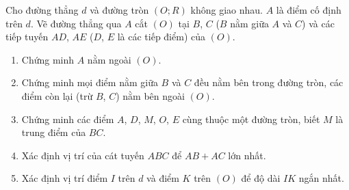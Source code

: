 \begin{bt}%
	Cho đường thẳng $d$ và đường tròn $(O;R)$ không giao nhau. $A$ là điểm cố định trên $d$. Vẽ đường thẳng qua $A$ cắt $(O)$ tại $B$, $C$ ($B$ nằm giữa $A$ và $C$) và các tiếp tuyến $AD$, $AE$ ($D$, $E$ là các tiếp điểm) của $(O)$.
	\begin{enumerate}
		\item Chứng minh $A$ nằm ngoài $(O)$.
		\item Chứng minh mọi điểm nằm giữa $B$ và $C$ đều nằm bên trong đường tròn, các điểm còn lại (trừ $B$, $C$) nằm bên ngoài $(O)$.
		\item Chứng minh các điểm $A$, $D$, $M$, $O$, $E$ cùng thuộc một đường tròn, biết $M$ là trung điểm của $BC$.
		\item Xác định vị trí của cát tuyến $ABC$ để $AB+AC$ lớn nhất.
		\item Xác định vị trí điểm $I$ trên $d$ và điểm $K$ trên $(O)$ để độ dài $IK$ ngắn nhất.
	\end{enumerate}
\end{bt}
